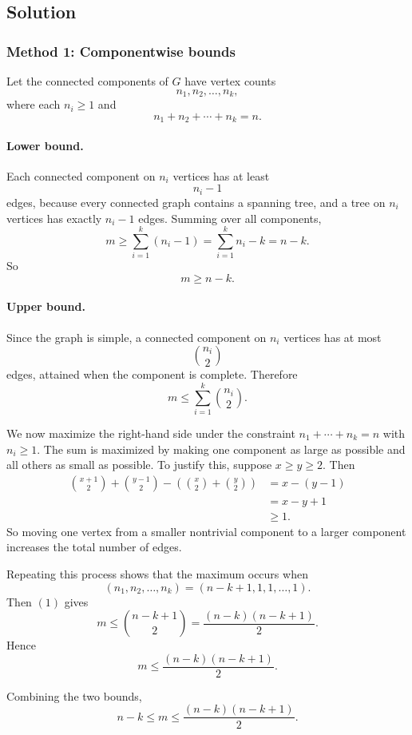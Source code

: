\documentclass[12pt]{article}
\begin{document}
\subsection{Solution}

\subsubsection{Method 1: Componentwise bounds}
Let the connected components of \(G\) have vertex counts
\[
n_1,n_2,\dots,n_k,
\]
where each \(n_i\ge 1\) and
\[
n_1+n_2+\cdots+n_k=n.
\]

\paragraph{Lower bound.}
Each connected component on \(n_i\) vertices has at least
\[
n_i-1
\]
edges, because every connected graph contains a spanning tree, and a tree on \(n_i\) vertices has exactly \(n_i-1\) edges. Summing over all components,
\[
m \ge \sum_{i=1}^k (n_i-1)=\sum_{i=1}^k n_i-k=n-k.
\]
So
\[
\boxed{m\ge n-k.}
\]

\paragraph{Upper bound.}
Since the graph is simple, a connected component on \(n_i\) vertices has at most
\[
\binom{n_i}{2}
\]
edges, attained when the component is complete. Therefore
\[
m\le \sum_{i=1}^k \binom{n_i}{2}. \tag{1}
\]

We now maximize the right-hand side under the constraint \(n_1+\cdots+n_k=n\) with \(n_i\ge 1\). The sum is maximized by making one component as large as possible and all others as small as possible. To justify this, suppose \(x\ge y\ge 2\). Then
\begin{align*}
\binom{x+1}{2}+\binom{y-1}{2}-\left(\binom{x}{2}+\binom{y}{2}\right)
&=x-(y-1)\\
&=x-y+1\\
&\ge 1.
\end{align*}
So moving one vertex from a smaller nontrivial component to a larger component increases the total number of edges.

Repeating this process shows that the maximum occurs when
\[
(n_1,n_2,\dots,n_k)=(n-k+1,1,1,\dots,1).
\]
Then \((1)\) gives
\[
m\le \binom{n-k+1}{2}
=\frac{(n-k)(n-k+1)}{2}.
\]
Hence
\[
\boxed{m\le \frac{(n-k)(n-k+1)}{2}.}
\]

Combining the two bounds,
\[
\boxed{n-k \le m \le \frac{(n-k)(n-k+1)}{2}.}
\]
\end{document}
